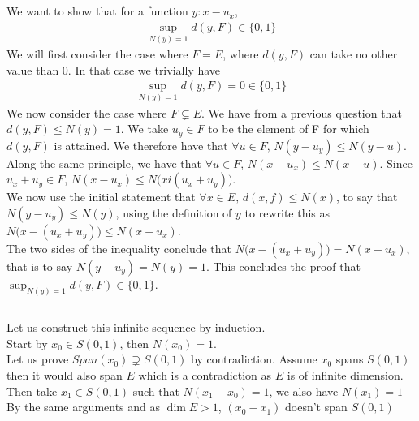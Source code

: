 \documentclass{article}
\begin{document}
\subsection{} %
We want to show that for a function $y:x-u_x$, 
\begin{align*}
	\sup _{N(y) = 1} d(y,F) \in \{ 0,1\}
\end{align*}
We will first consider the case where $F = E$, where $d(y,F)$ can take no other value than 0. In that case we trivially have
\begin{align*}
	\sup _{N(y) = 1} d(y,F) = 0 \in \{ 0,1\}
\end{align*}
We now consider the case where $F \subsetneq E$. We have from a previous question that $d(y,F) \leq N(y) = 1$. We take $u_y \in F$ to be the element of F for which $d(y,F)$ is attained. We therefore have that $\forall u \in F, \, N(y - u_y) \leq N(y - u)$. Along the same principle, we have that $\forall u \in F, \, N(x - u_x) \leq N(x - u)$. Since $u_x + u_y \in F$, $N(x - u_x) \leq N\big( x i (u_x + u_y)\big)$.\\
\noindent We now use the initial statement that $\forall x \in E, \, d(x,f) \leq N(x)$, to say that $N(y- u_y) \leq N(y)$, using the definition of $y$ to rewrite this as $N\big( x - (u_x + u_y)\big) \leq N(x - u_x)$.\\
\noindent The two sides of the inequality conclude that $N\big( x - (u_x + u_y)\big) = N(x - u_x)$, that is to say $N(y- u_y) = N(y) = 1$. This concludes the proof that $\sup _{N(y) = 1} d(y,F) \in \{ 0,1\}$.

\subsection{} %

Let us construct this infinite sequence by induction. \\

\noindent Start by $x_0 \in S(0,1)$, then $N(x_0)=1$. \\
Let us prove $Span(x_0) \supsetneq S(0,1)$ by contradiction. Assume $x_0$ spans $S(0,1)$ then it would also span $E$ which is a contradiction as $E$ is of infinite dimension. \\

\noindent Then take $x_1 \in S(0,1)$ such that $N(x_1-x_0)=1$, we also have $N(x_1)=1$ \\
By the same arguments and as $\dim E > 1$, $(x_0 - x_1)$ doesn't span $S(0,1)$ \\
\end{document}
